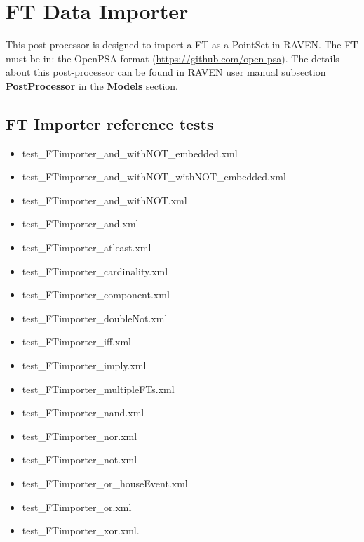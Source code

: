 \section{FT Data Importer}
\label{sec:FTdataImporter}

This post-processor is designed to import a FT as a PointSet in RAVEN.
The FT must be in: the OpenPSA format (\href{<url>}{https://github.com/open-psa}).
The details about this post-processor can be found in RAVEN user manual subsection \textbf{PostProcessor}
in the \textbf{Models} section.

\subsection{FT Importer reference tests}
\begin{itemize}
	\item test\_FTimporter\_and\_withNOT\_embedded.xml
	\item test\_FTimporter\_and\_withNOT\_withNOT\_embedded.xml
	\item test\_FTimporter\_and\_withNOT.xml
	\item test\_FTimporter\_and.xml
	\item test\_FTimporter\_atleast.xml
	\item test\_FTimporter\_cardinality.xml
	\item test\_FTimporter\_component.xml
	\item test\_FTimporter\_doubleNot.xml
	\item test\_FTimporter\_iff.xml
	\item test\_FTimporter\_imply.xml
	\item test\_FTimporter\_multipleFTs.xml
	\item test\_FTimporter\_nand.xml
	\item test\_FTimporter\_nor.xml
	\item test\_FTimporter\_not.xml
	\item test\_FTimporter\_or\_houseEvent.xml
	\item test\_FTimporter\_or.xml
	\item test\_FTimporter\_xor.xml.
\end{itemize}
